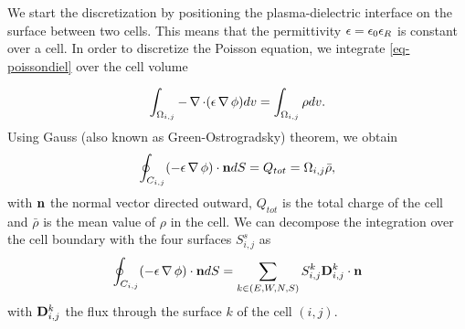     We start the discretization by positioning the plasma-dielectric interface on the surface between two cells.
    This means that the permittivity $\epsilon = \epsilon_0 \epsilon_{R}$ is  constant over a cell.
    In order to discretize the Poisson equation, we integrate \cref{eq-poissondiel} over the cell volume

    \begin{equation}
    \int_{\Omega_{i,j}} - \operatorname{{\mathbf \nabla}} \cdot (\epsilon \operatorname{{\mathbf \nabla}} \phi) dv= \int_{\Omega_{i,j}} \rho dv.
    \end{equation}
    Using Gauss (also known as Green-Ostrogradsky) theorem, we obtain
    \begin{equation}
    \oint_{C_{i,j}} ( - \epsilon \operatorname{{\mathbf \nabla}} \phi) \cdot {\mathbf n} dS = Q_{tot} =  \Omega_{i,j} \bar{\rho},
    \end{equation}
    with ${\mathbf n}$ the normal vector directed outward, $Q_{tot}$ is the total charge of the cell and $\bar{\rho}$ is the mean value of $\rho$ in the cell.
    We can decompose the integration over the cell boundary with the four surfaces $S^s_{i,j}$ as
    \begin{equation}
      \label{eq-poissonsum}
    \oint_{C_{i,j}} (-\epsilon \operatorname{{\mathbf \nabla}} \phi) \cdot {\mathbf n} dS = \sum_{k\in(E,W,N,S)} S^k_{i,j} {\mathbf D}^k_{i,j} \cdot {\mathbf n}
    \end{equation}
    with ${\mathbf D}^k_{i,j}$ the flux through the surface $k$ of the cell $(i,j)$.


